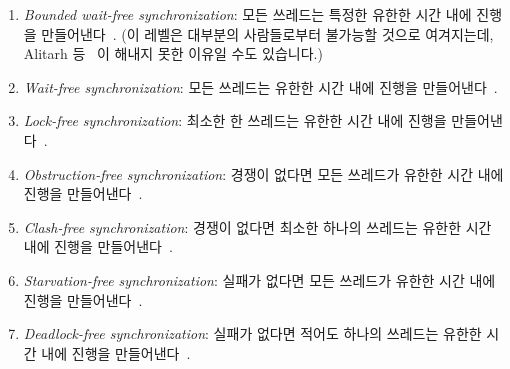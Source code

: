 \begin{enumerate}
\item	\emph{Bounded wait-free synchronization}: 모든 쓰레드는 특정한 유한한
	시간 내에 진행을 만들어낸다~\cite{Herlihy91}.
	(이 레벨은 대부분의 사람들로부터 불가능할 것으로 여겨지는데, Alitarh
	등~\cite{DanAlitarh2013PracticalProgress} 이 해내지 못한 이유일 수도
	있습니다.)
\item	\emph{Wait-free synchronization}: 모든 쓰레드는 유한한 시간 내에 진행을
	만들어낸다~\cite{Herlihy93}.
\item	\emph{Lock-free synchronization}: 최소한 한 쓰레드는 유한한 시간 내에
	진행을 만들어낸다~\cite{Herlihy93}.
\item	\emph{Obstruction-free synchronization}: 경쟁이 없다면 모든 쓰레드가
	유한한 시간 내에 진행을 만들어낸다~\cite{HerlihyLM03}.
\item	\emph{Clash-free synchronization}: 경쟁이 없다면 최소한 하나의 쓰레드는
	유한한 시간 내에 진행을
	만들어낸다~\cite{DanAlitarh2013PracticalProgress}.
\item	\emph{Starvation-free synchronization}: 실패가 없다면 모든 쓰레드가
	유한한 시간 내에 진행을
	만들어낸다~\cite{DanAlitarh2013PracticalProgress}.
\item	\emph{Deadlock-free synchronization}: 실패가 없다면 적어도 하나의
	쓰레드는 유한한 시간 내에 진행을
	만들어낸다~\cite{DanAlitarh2013PracticalProgress}.
\end{enumerate}
\iffalse

\item	\emph{Bounded wait-free synchronization}: Every thread
	will make progress within
	a specific finite period of time~\cite{Herlihy91}.
	(Note that this level is 
	widely considered to be unachievable, which might be why
	Alitarh et al.~\cite{DanAlitarh2013PracticalProgress}
	omitted it.)
\item	\emph{Wait-free synchronization}: Every thread will make progress
	in finite time~\cite{Herlihy93}.
\item	\emph{Lock-free synchronization}: At least one thread will
	make progress in finite time~\cite{Herlihy93}.
\item	\emph{Obstruction-free synchronization}: Every thread will
	make progress in finite time in the absence of
	contention~\cite{HerlihyLM03}.
\item	\emph{Clash-free synchronization}: At least one thread will
	make progress in finite time in the absence of
	contention~\cite{DanAlitarh2013PracticalProgress}.
\item	\emph{Starvation-free synchronization}: Every thread will
	make progress in finite time in the absence of
	failures~\cite{DanAlitarh2013PracticalProgress}.
\item	\emph{Deadlock-free synchronization}: At least one thread will
	make progress in finite time in the absence of
	failures~\cite{DanAlitarh2013PracticalProgress}.
\end{enumerate}
\fi


